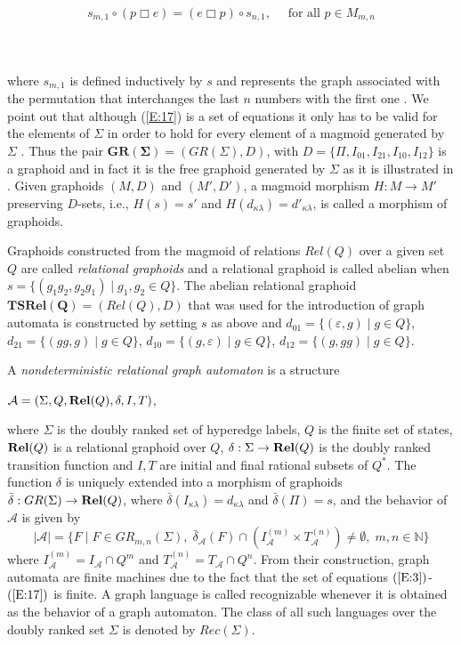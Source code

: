 \documentclass[runningheads,a4paper]{llncs}
\newcommand{\N}{\mathbb{N}}
\newcommand{\gk}{\kappa}
\newcommand{\gl}{\lambda}
\newcommand{\mc}{\mathcal}
\newcommand{\bx}{\mathbin{\Box}}
\newcommand{\bc}{\begin{center}}
\newcommand{\ec}{\end{center}}
\begin{document}
\begin{minipage}[b]{340pt}
\begin{align}\label{E:17}
 s_{m,1}\circ (p \bx e ) = (e \bx p )\circ
s_{n,1},\quad\mbox{ for all } p\in M_{m,n}
\end{align}
\end{minipage}\\ \\
where $s_{m,1}$ is defined inductively by $s$  and represents the graph associated with the permutation
that interchanges the last $n$ numbers with the first one \cite{BK1}. We point out that although (\ref{E:17}) is a set of equations it only has to be valid for the elements of $\Sigma$ in order to hold for every element of a magmoid generated by $\Sigma$ \cite{BK1}.   Thus the pair $\mathbf{GR(\Sigma)}=(GR(\Sigma),D)$, with $D=\{\Pi ,I_{01},I_{21}, I_{10}, I_{12}\}$ is a graphoid and in fact it is the free graphoid
generated by $\Sigma$ as it is illustrated in \cite{BK3}. Given graphoids $(M,D)$ and $(M',D')$, a magmoid morphism $H:M\to M'$ preserving $D$-sets, i.e.,  $H(s)=s'$ and $H(d_{\gk\gl})= d'_{\gk\gl}$, is called a morphism of graphoids.

Graphoids constructed from the magmoid of relations $Rel(Q)$ over a given set $Q$ are called \emph{relational graphoids} and a relational graphoid is called abelian when  $s=\{(g_1g_2,g_2g_1)\mid g_1,g_2\in Q\}$. The abelian relational graphoid $\mathbf{TSRel(Q)}=(Rel(Q),D)$ that was used for the introduction of graph automata is constructed by setting $s$ as above and
  $d_{01}=\{(\varepsilon,g)\mid
g\in Q\}$,
   $d_{21}=\{(gg,g)\mid
g\in Q\}$,
$d_{10}=\{(g,\varepsilon)\mid
g\in Q\}$,
 $d_{12}=\{(g,gg)\mid
g\in Q\}$.

A \emph{nondeterministic relational graph automaton} is a structure
\bc
$\mathcal{A}=(\Sigma,Q,\bold{Rel}(Q),\delta ,I ,T )$,
\ec
where $\Sigma$ is the doubly ranked set of hyperedge labels,     $Q$ is the finite set of states,   $\bold{Rel}(Q)$ is a relational graphoid over $Q$,    $\delta  :\Sigma \to \bold{Rel}(Q)$  is the doubly ranked transition function and  $I ,T $ are initial and final rational subsets of
$Q^*$. The function $\delta$ is uniquely extended into a morphism of graphoids
$\bar{\delta} :GR(\Sigma)\to \bold{Rel}(Q)$, where $\bar{\delta} (I_{\gk\gl})=d_{\gk\gl}$ and $\bar{\delta} (\Pi)=s$,
and the behavior of $\mathcal{A}$ is given by
\[
|\mathcal{A}|=\{F\mid F\in GR_{m,n}(\Sigma),\;
\bar{\delta}_\mathcal{A}(F)\cap (I_{\mc{A}}^{(m)}\times
T_{\mc{A}}^{(n)})\neq \emptyset,\; m,n\in \N\}
\]
where $I_{\mc{A}}^{(m)}=I_\mathcal{A}\cap Q^m$ and
$T_{\mc{A}}^{(n)}=T_\mathcal{A}\cap Q^n$. From their construction, graph automata are
finite machines due to the fact that the set of equations
$(\ref{E:3})$-$(\ref{E:17})$ is finite.
A graph language is called recognizable whenever it is obtained as
the behavior of a graph automaton. The class of all such languages
over the doubly ranked set $\Sigma$ is denoted by
 $Rec(\Sigma)$.
\end{document}
